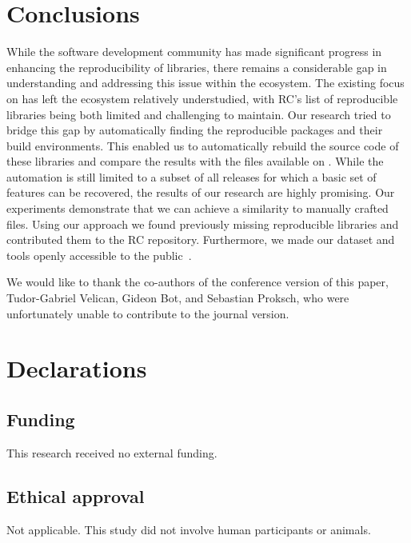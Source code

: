 \documentclass[smallextended]{svjour3}
\newcommand{\maven}[1]{\tool{Maven{#1}}}
\begin{document}
\section{Conclusions}\label{sec:conclusions}

While the software development community has made significant progress in enhancing the reproducibility of libraries, there remains a considerable gap in understanding and addressing this issue within the \maven{} ecosystem. The existing focus on  has left the \maven{} ecosystem relatively understudied, with RC's list of reproducible \maven{} libraries being both limited and challenging to maintain. Our research tried to bridge this gap by automatically finding the reproducible \maven{} packages and their build environments. This enabled us to automatically rebuild the source code of these libraries and compare the results with the files available on \maven{}.
While the automation is still limited to a subset of all releases for which a basic set of features can be recovered, the results of our research are highly promising.
Our experiments demonstrate that we can achieve a  similarity to manually crafted  files.
Using our approach we found previously missing reproducible libraries and contributed them to the RC repository.
Furthermore, we made our dataset and tools openly accessible to the public~\cite{repPackage}.

\begin{acknowledgements}
We would like to thank the co-authors of the conference version of this paper, Tudor-Gabriel Velican, Gideon Bot, and Sebastian Proksch, who were unfortunately unable to contribute to the journal version.
\end{acknowledgements}

\section{Declarations}

\subsection*{Funding} This research received no external funding.

\subsection*{Ethical approval}
Not applicable. This study did not involve human participants or animals.
\end{document}
